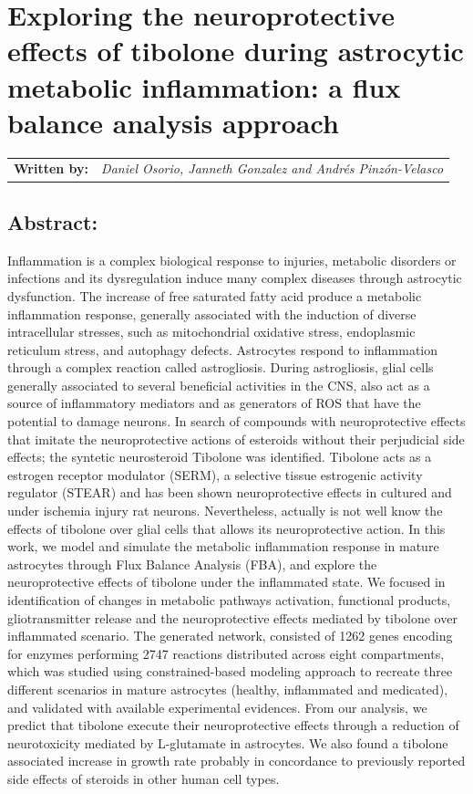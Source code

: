 \chapter{Exploring the neuroprotective effects of tibolone during astrocytic metabolic inflammation: a flux balance analysis approach}
\begin{tabular}{rm{12cm}}
\textsf{\textbf{Written by:}} & \textit{Daniel Osorio, Janneth Gonzalez and Andrés Pinzón-Velasco}\\ 
\end{tabular}
\section*{Abstract:}
Inflammation is a complex biological response to injuries, metabolic disorders or infections and its dysregulation induce many complex diseases through astrocytic dysfunction. The increase of free saturated fatty acid produce a metabolic inflammation response, generally associated with the induction of diverse intracellular stresses, such as mitochondrial oxidative stress, endoplasmic reticulum stress, and autophagy defects.  Astrocytes respond to inflammation through a complex reaction called astrogliosis. During astrogliosis, glial cells generally associated to several beneficial activities in the CNS, also act as a source of inflammatory mediators and as generators of ROS that have the potential to damage neurons. In search of compounds with neuroprotective effects that imitate the neuroprotective actions of esteroids without their perjudicial side effects; the syntetic neurosteroid Tibolone was identified. Tibolone acts as a estrogen receptor modulator (SERM), a selective tissue estrogenic activity regulator (STEAR) and has been shown neuroprotective effects in cultured and under ischemia injury rat neurons. Nevertheless, actually is not well know the effects of tibolone over glial cells that allows its neuroprotective action. In this work, we model and simulate the metabolic inflammation response in mature astrocytes through Flux Balance Analysis (FBA), and explore the neuroprotective effects of tibolone under the inflammated state. We focused in identification of changes in metabolic pathways activation, functional products, gliotransmitter release and the neuroprotective effects mediated by tibolone over inflammated scenario. The generated network, consisted of 1262 genes encoding for enzymes performing 2747 reactions distributed across eight compartments, which was studied using constrained-based modeling approach to recreate three different scenarios in mature astrocytes (healthy, inflammated and medicated), and validated with available experimental evidences. From our analysis, we predict that tibolone execute their neuroprotective effects through a reduction of neurotoxicity mediated by L-glutamate in astrocytes. We also found a tibolone associated increase in growth rate probably in concordance to previously reported side effects of steroids in other human cell types.
